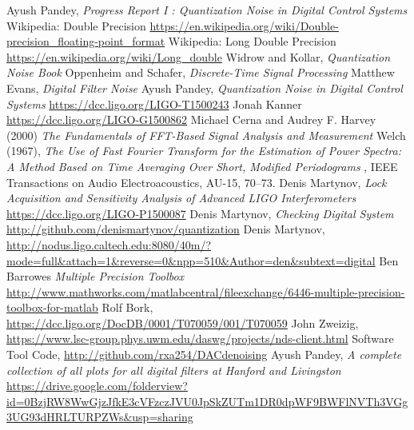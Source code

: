 \documentclass[colorlinks=true,pdfstartview=FitV,linkcolor=blue,
            citecolor=red,urlcolor=magenta]{ligodoc}
\begin{document}
\begin{thebibliography}{20}
 Ayush Pandey, \emph{Progress Report I : Quantization Noise in Digital Control Systems} 
 Wikipedia: Double Precision \url{https://en.wikipedia.org/wiki/Double-precision_floating-point_format}
 Wikipedia: Long Double Precision \url{https://en.wikipedia.org/wiki/Long_double}
Widrow and Kollar, \emph{Quantization Noise Book}
 Oppenheim and Schafer, \emph{Discrete-Time Signal Processing}
 Matthew Evans, \emph{Digital Filter Noise}
 Ayush Pandey, \emph{Quantization Noise in Digital Control Systems} \url{https://dcc.ligo.org/LIGO-T1500243}
 Jonah Kanner \url{https://dcc.ligo.org/LIGO-G1500862}
 Michael Cerna and Audrey F. Harvey (2000) \emph{The Fundamentals of FFT-Based Signal Analysis and Measurement}
 Welch (1967),  \emph{The Use of Fast Fourier Transform for the Estimation of Power Spectra: A Method Based on Time Averaging Over Short, Modified Periodograms} , IEEE Transactions on Audio Electroacoustics, AU-15, 70–73.
 Denis Martynov, \emph{Lock Acquisition and Sensitivity Analysis of Advanced LIGO Interferometers} \url{https://dcc.ligo.org/LIGO-P1500087}
 Denis Martynov, \emph{Checking Digital System} \url{http://github.com/denismartynov/quantization}
 Denis Martynov, \url{http://nodus.ligo.caltech.edu:8080/40m/?mode=full&attach=1&reverse=0&npp=510&Author=den&subtext=digital}  
  Ben Barrowes \emph{Multiple Precision Toolbox} \url{http://www.mathworks.com/matlabcentral/fileexchange/6446-multiple-precision-toolbox-for-matlab}
 Rolf Bork, \url{https://dcc.ligo.org/DocDB/0001/T070059/001/T070059}
 John Zweizig, \url{https://www.lsc-group.phys.uwm.edu/daswg/projects/nds-client.html}
 Software Tool Code, \url{http://github.com/rxa254/DACdenoising}
 Ayush Pandey, \emph{A complete collection of all plots for all digital filters at Hanford and Livingston} \url{https://drive.google.com/folderview?id=0BzjRW8WwGjzJfkE3cVFzczJVU0JpSkZUTm1DR0dpWF9BWFlNVTh3VGg3UG93dHRLTURPZWs&usp=sharing}


\end{thebibliography}  
\end{document}
